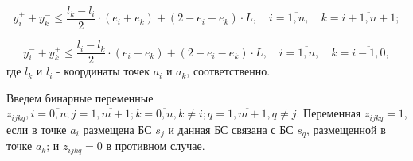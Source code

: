 \begin{equation}
  \label{eq:part3_yi_3}
  y_i^+ + y_k^- \leq \frac{l_k - l_i}{2} \cdot (e_i + e_k ) + (2 - e_i - e_k ) \cdot L, \quad i = \overline{1,n},  \quad k = \overline{i+1,n+1};
\end{equation}

\begin{equation}
  \label{eq:part3_yi_4}
  y_i^- + y_k^+  \leq \frac{l_i-l_k}{2} \cdot (e_i + e_k) + (2 - e_i - e_k) \cdot L, \quad i = \overline{1,n}, \quad k = \overline{i-1,0},
\end{equation}
где $ l_k $ и $ l_i $ - координаты точек $ a_i $ и $ a_k $, соответственно. 


Введем бинарные переменные $z_{ijkq}, i = \overline{0,n}; j= \overline{1,m+1}; k=\overline{0,n},  k \neq i; q= \overline{1,m+1}, q \neq j$. Переменная $ z_ {ijkq} = 1$, если в точке $ a_i $ размещена БС $ s_j $ и данная БС связана с БС $ s_q $, размещенной в точке $ a_k $; и $ z_ {ijkq} = 0 $ в противном случае.
%



